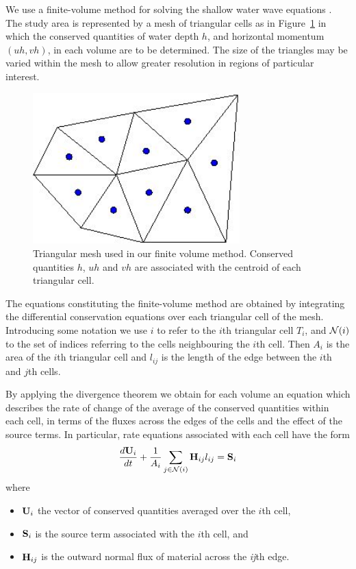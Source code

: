 \documentclass{manual}
\begin{document}
We use a finite-volume method for solving the shallow water wave
equations \cite{ZR1999}. The study area is represented by a mesh of
triangular cells as in Figure~\ref{fig:mesh} in which the conserved
quantities of  water depth $h$, and horizontal momentum $(uh, vh)$,
in each volume are to be determined. The size of the triangles may
be varied within the mesh to allow greater resolution in regions of
particular interest.

\begin{figure}[htp] \begin{center}
  \includegraphics[width=8.0cm,keepaspectratio=true]{graphics/step-five}
  \caption{Triangular mesh used in our finite volume method. Conserved
           quantities $h$, $uh$ and $vh$ are associated with the centroid of
           each triangular cell.}
  \label{fig:mesh}
\end{center} \end{figure}

The equations constituting the finite-volume method are obtained by
integrating the differential conservation equations over each
triangular cell of the mesh. Introducing some notation we use $i$ to
refer to the $i$th triangular cell $T_i$, and ${\cal N}(i)$ to the
set of indices referring to the cells neighbouring the $i$th cell.
Then $A_i$ is the area of the $i$th triangular cell and $l_{ij}$ is
the length of the edge between the $i$th and $j$th cells.

By applying the divergence theorem we obtain for each volume an
equation which describes the rate of change of the average of the
conserved quantities within each cell, in terms of the fluxes across
the edges of the cells and the effect of the source terms. In
particular, rate equations associated with each cell have the form
$$
 \frac{d\mathbf{U}_i }{dt}+ \frac1{A_i}\sum\limits_{j\in{\cal N}(i)} \mathbf{H}_{ij} l_{ij} = \mathbf{S}_i
$$
where
\begin{itemize}
  \item $\mathbf{U}_i$ the vector of conserved quantities averaged over the $i$th cell,
  \item $\mathbf{S}_i$ is the source term associated with the $i$th cell, and
  \item $\mathbf{H}_{ij}$ is the outward normal flux of material across the \textit{ij}th edge.
\end{itemize}
\end{document}
